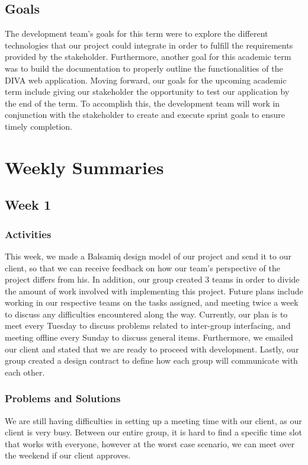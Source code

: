 \documentclass[journal,10pt,onecolumn,compsoc]{IEEEtran} \usepackage[margin=1.0in]{geometry} \usepackage{pdfpages}
\begin{document}
\subsection{Goals}
The development team's goals for this term were to explore the different technologies that our project could integrate in order to fulfill the requirements provided by the stakeholder. Furthermore, another goal for this academic term was to build the documentation to properly outline the functionalities of the DIVA web application. Moving forward, our goals for the upcoming academic term include giving our stakeholder the opportunity to test our application by the end of the term. To accomplish this, the development team will work in conjunction with the stakeholder to create and execute sprint goals to ensure timely completion. 

\section{Weekly Summaries}
\subsection{Week 1}
    \subsubsection{Activities}
    This week, we made a Balsamiq design model of our project and send it to our client, so that we can receive feedback on how our team's perspective of the project differs from his. In addition, our group created 3 teams in order to divide the amount of work involved with implementing this project. Future plans include working in our respective teams on the tasks assigned, and meeting twice a week to discuss any difficulties encountered along the way. Currently, our plan is to meet every Tuesday to discuss problems related to inter-group interfacing, and meeting offline every Sunday to discuss general items. Furthermore, we emailed our client and stated that we are ready to proceed with development.  Lastly, our group created a design contract to define how each group will communicate with each other. 
    \subsubsection{Problems and Solutions}
    We are still having difficulties in setting up a meeting time with our client, as our client is very busy. Between our entire group, it is hard to find a specific time slot that works with everyone, however at the worst case scenario, we can meet over the weekend if our client approves. 
    
\end{document}
